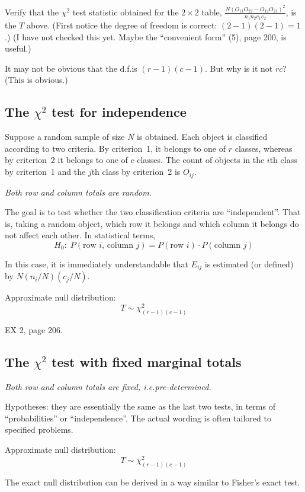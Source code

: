 \documentclass[12pt]{article}
\begin{document}
\exercise
Verify that the $\chi^2$ test statistic obtained for the
$2\times 2$ table,
$\frac{N(O_{11}O_{22} - O_{12}O_{21})^2}{n_1n_2c_1c_2}$,
is the $T$ above.
(First notice the degree of freedom is correct:
$(2-1)(2-1) = 1$.)
(I have not checked this yet. Maybe the ``convenient form''
(5), page 200, is useful.)

\alert[Question]%
It may not be obvious that the d.f.\@ is $(r-1)(c-1)$.
But why is it not $rc$? (This is obvious.)


\subsection{The $\chi^2$ test for independence}

Suppose a random sample of size $N$ is obtained.
Each object is classified according to two criteria.
By criterion~1, it belongs to one of $r$ classes,
whereas by criterion~2 it belongs to one of $c$ classes.
The count of objects in the $i$th class by criterion~1 and the $j$th
class by criterion~2 is $O_{ij}$.

\emph{Both row and column totals are random.}

The goal is to test whether the two classification criteria
are ``independent''.
That is, taking a random object,
which row it belongs and which column it belongs do not affect each
other. In statistical terms,
\[
H_0:\;
P(\text{row $i$, column $j$})
= P(\text{row $i$}) \cdot P(\text{column $j$})
\]

In this case,
it is immediately understandable that
$E_{ij}$ is estimated (or defined) by
$N(n_i/N)(c_j/N)$.

Approximate null distribution:
\[
T \sim \chi^2_{(r-1)(c-1)}
\]

\example EX 2, page 206.

\subsection{The $\chi^2$ test with fixed marginal totals}

\emph{Both row and column totals are fixed, i.e.\@ pre-determined.}

Hypotheses:
they are essentially the same as the last two tests,
in terms of ``probabilities'' or ``independence''.
The actual wording is often tailored to specified problems.

Approximate null distribution:
\[
T \sim \chi^2_{(r-1)(c-1)}
\]

The exact null distribution can be derived in a way
similar to Fisher's exact test.
\end{document}
